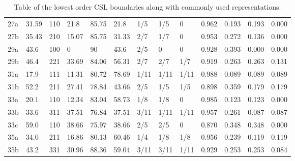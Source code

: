 \begin{table}[t]
{\begin{tabular}{|l|l|c|l|l|l|l|l|l|l|l|l|l|}
27a& 31.59&  110&  21.8&  85.75& 21.8&1/5&1/5&0&  0.962 & 0.193& 0.193& 0.000\\
27b& 35.43&  210&  15.07& 85.75& 31.33&  2/7& 1/7& 0&  0.953 & 0.272& 0.136& 0.000\\
29a& 43.6&100&  0&  90& 43.6&2/5&0&0&  0.928 & 0.393& 0.000& 0.000\\
\hline
29b&  46.4&  221&  33.69& 84.06& 56.31&  2/7&  2/7&  1/7&  0.919 &  0.263&  0.263& 0.131\\
31a& 17.9&111&  11.31& 80.72& 78.69&  1/11& 1/11& 1/11& 0.988 & 0.089&  0.089&  0.089\\
31b& 52.2&211&  27.41& 78.84& 43.66&  2/5&1/5&1/5&  0.898 & 0.359 & 0.179& 0.179\\
33a& 20.1&110&  12.34& 83.04& 58.73&  1/8& 1/8& 0& 0.985 &  0.123& 0.123& 0.000\\
33b& 33.6&311&  37.51& 76.84& 37.51&  3/11& 1/11& 1/11&  0.957 & 0.261&0.087& 0.087\\
\hline
33c& 59.0&110&  38.66& 75.97& 38.66&  2/5&2/5&0& 0.870 & 0.348& 0.348& 0.000\\
35a& 34.0&211&  16.86& 80.13& 60.46&  1/4& 1/8& 1/8&0.956 & 0.239& 0.119& 0.119 \\
35b& 43.2&331&  30.96& 88.36& 59.04&  3/11& 3/11& 1/11&0.929 & 0.253& 0.253& 0.084 \\
\hline
\end{tabular}}
\caption{\label{\chabbr:tb:CSL}Table of the lowest order CSL boundaries along with commonly used representations.}
\end{table}

